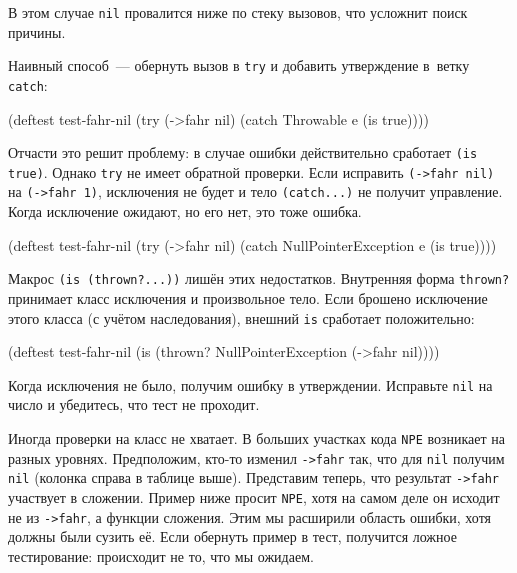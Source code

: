 \fi


\noindent
В этом случае \verb|nil| провалится ниже по стеку вызовов, что усложнит поиск
причины.

Наивный способ~--- обернуть вызов в \verb|try| и добавить утверждение в~ветку
\verb|catch|:

\begin{english}
  \begin{clojure}
(deftest test-fahr-nil
  (try
    (->fahr nil)
    (catch Throwable e
      (is true))))
  \end{clojure}
\end{english}

Отчасти это решит проблему: в случае ошибки действительно сработает
\verb|(is true)|. Однако \verb|try| не имеет обратной проверки. Если исправить
\verb|(->fahr nil)| на \verb|(->fahr 1)|, исключения не будет и тело
\verb|(catch...)| не получит управление. Когда исключение ожидают, но его нет,
это тоже ошибка.

\pagebreakafive

\iflarge\vspace{15mm}\pagebreak[4]\fi


\begin{english}
  \begin{clojure}
(deftest test-fahr-nil
  (try
    (->fahr nil)
    (catch NullPointerException e
      (is true))))
  \end{clojure}
\end{english}

Макрос \verb|(is (thrown?...))| лишён этих недостатков. Внутренняя форма
\verb|thrown?| принимает класс исключения и произвольное тело. Если брошено
исключение этого класса (с учётом наследования), внешний \verb|is| сработает
положительно:

\begin{english}
  \begin{clojure}
(deftest test-fahr-nil
  (is (thrown? NullPointerException
               (->fahr nil))))
  \end{clojure}
\end{english}

Когда исключения не было, получим ошибку в утверждении. Исправьте \verb|nil|
на число и убедитесь, что тест не проходит.


Иногда проверки на класс не хватает. В больших участках кода \verb|NPE|
возникает на разных уровнях. Предположим, кто-то изменил \verb|->fahr| так, что
для \verb|nil| получим \verb|nil| (колонка справа в таблице выше). Представим
теперь, что результат \verb|->fahr| участвует в сложении. Пример ниже просит
\verb|NPE|, хотя на самом деле он исходит не из \verb|->fahr|, а функции
сложения. Этим мы расширили область ошибки, хотя должны были сузить её. Если
обернуть пример в тест, получится ложное тестирование: происходит не то, что мы
ожидаем.

